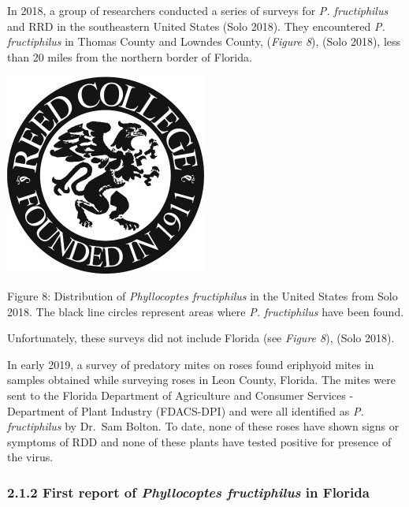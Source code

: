 \documentclass[12pt,final,CPage]{ufthesis}
\begin{document}
{  In 2018, a group of researchers conducted a series of surveys for \emph{P. fructiphilus} and RRD in the southeastern United States (Solo 2018). They encountered \emph{P. fructiphilus} in Thomas County and Lowndes County, (\emph{Figure 8}), (Solo 2018), less than 20 miles from the northern border of Florida.
  \begin{center}\includegraphics[width=0.8\linewidth]{figure/reed} \end{center}

  Figure 8: Distribution of \emph{Phyllocoptes fructiphilus} in the United States from Solo 2018. The black line circles represent areas where \emph{P. fructiphilus} have been found.

  Unfortunately, these surveys did not include Florida (see \emph{Figure 8}), (Solo 2018).

  In early 2019, a survey of predatory mites on roses found eriphyoid mites in samples obtained while surveying roses in Leon County, Florida. The mites were sent to the Florida Department of Agriculture and Consumer Services - Department of Plant Industry (FDACS-DPI) and were all identified as \emph{P. fructiphilus} by Dr.~Sam Bolton. To date, none of these roses have shown signs or symptoms of RDD and none of these plants have tested positive for presence of the virus.

  \hypertarget{first-report-of-phyllocoptes-fructiphilus-in-florida-1}{%
  \subsubsection{\texorpdfstring{2.1.2 First report of \emph{Phyllocoptes fructiphilus} in Florida}{2.1.2 First report of Phyllocoptes fructiphilus in Florida}}\label{first-report-of-phyllocoptes-fructiphilus-in-florida-1}}

}
\end{document}
